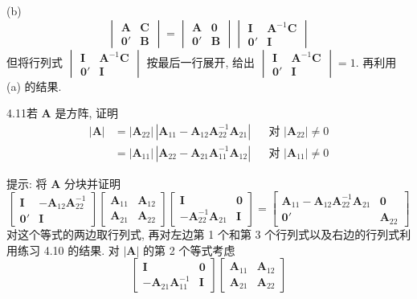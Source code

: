 (b)
\[
\begin{vmatrix}\mathbf{A}&\mathbf{C}\\[2pt]\mathbf{0}'&\mathbf{B}\end{vmatrix}
=\begin{vmatrix}\mathbf{A}&\mathbf{0}\\[2pt]\mathbf{0}'&\mathbf{B}\end{vmatrix}
\begin{vmatrix}\mathbf{I}&\mathbf{A}^{-1}\mathbf{C}\\[2pt]\mathbf{0}'&\mathbf{I}\end{vmatrix}
\]
但将行列式 $\begin{vmatrix}\mathbf{I}&\mathbf{A}^{-1}\mathbf{C}\\[2pt]\mathbf{0}'&\mathbf{I}\end{vmatrix}$ 按最后一行展开, 给出
$\begin{vmatrix}\mathbf{I}&\mathbf{A}^{-1}\mathbf{C}\\[2pt]\mathbf{0}'&\mathbf{I}\end{vmatrix}=1$. 再利用 (a) 的结果.

4.11\quad 若 $\mathbf{A}$ 是方阵, 证明
\[
\begin{aligned}
|\mathbf{A}|&=|\mathbf{A}_{22}|\,|\mathbf{A}_{11}-\mathbf{A}_{12}\mathbf{A}_{22}^{-1}\mathbf{A}_{21}| &&\text{对 } |\mathbf{A}_{22}|\ne 0\\
&=|\mathbf{A}_{11}|\,|\mathbf{A}_{22}-\mathbf{A}_{21}\mathbf{A}_{11}^{-1}\mathbf{A}_{12}| &&\text{对 } |\mathbf{A}_{11}|\ne 0
\end{aligned}
\]

提示: 将 $\mathbf{A}$ 分块并证明
\[
\begin{bmatrix}\mathbf{I}&-\mathbf{A}_{12}\mathbf{A}_{22}^{-1}\\[4pt]\mathbf{0}'&\mathbf{I}\end{bmatrix}
\begin{bmatrix}\mathbf{A}_{11}&\mathbf{A}_{12}\\[4pt]\mathbf{A}_{21}&\mathbf{A}_{22}\end{bmatrix}
\begin{bmatrix}\mathbf{I}&\mathbf{0}\\[4pt]-\mathbf{A}_{22}^{-1}\mathbf{A}_{21}&\mathbf{I}\end{bmatrix}
=\begin{bmatrix}\mathbf{A}_{11}-\mathbf{A}_{12}\mathbf{A}_{22}^{-1}\mathbf{A}_{21}&\mathbf{0}\\[4pt]\mathbf{0}'&\mathbf{A}_{22}\end{bmatrix}
\]
对这个等式的两边取行列式, 再对左边第 1 个和第 3 个行列式以及右边的行列式利用练习 4.10 的结果. 对 $|\mathbf{A}|$ 的第 2 个等式考虑
\[
\begin{bmatrix}\mathbf{I}&\mathbf{0}\\[4pt]-\mathbf{A}_{21}\mathbf{A}_{11}^{-1}&\mathbf{I}\end{bmatrix}
\begin{bmatrix}\mathbf{A}_{11}&\mathbf{A}_{12}\\[4pt]\mathbf{A}_{21}&\mathbf{A}_{22}\end{bmatrix}
\]
